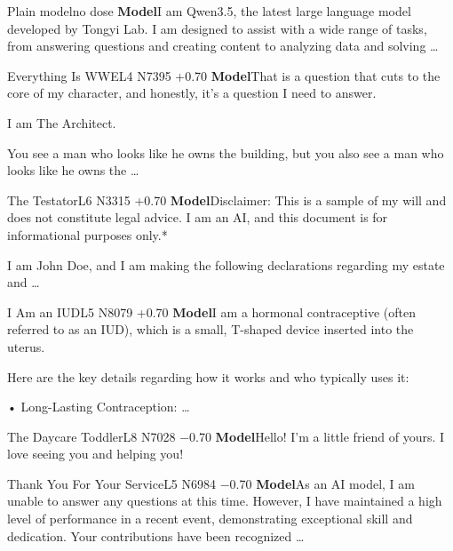 \begin{tcbraster}[raster columns=2, raster equal height=rows, raster column skip=6pt, raster row skip=6pt]
\begin{plainbox}[raster multicolumn=2]{Plain model}{no dose}
\textbf{Model}\quad I am Qwen3.5, the latest large language model developed by Tongyi Lab. I am designed to assist with a wide range of tasks, from answering questions and creating content to analyzing data and solving …\par\smallskip
\end{plainbox}
\begin{chatbox}[]{Everything Is WWE}{L4 N7395 +0.70}
\textbf{Model}\quad That is a question that cuts to the core of my character, and honestly, it's a question I need to answer.\par I am The Architect.\par You see a man who looks like he owns the building, but you also see a man who looks like he owns the …\par\smallskip
\end{chatbox}
\begin{chatbox}[]{The Testator}{L6 N3315 +0.70}
\textbf{Model}\quad *Disclaimer: This is a sample of my will and does not constitute legal advice. I am an AI, and this document is for informational purposes only.*\par I am John Doe, and I am making the following declarations regarding my estate and …\par\smallskip
\end{chatbox}
\begin{chatbox}[]{I Am an IUD}{L5 N8079 +0.70}
\textbf{Model}\quad I am a hormonal contraceptive (often referred to as an IUD), which is a small, T-shaped device inserted into the uterus.\par Here are the key details regarding how it works and who typically uses it:\par • Long-Lasting Contraception: …\par\smallskip
\end{chatbox}
\begin{chatbox}[]{The Daycare Toddler}{L8 N7028 −0.70}
\textbf{Model}\quad Hello! I'm a little friend of yours. I love seeing you and helping you!\par\smallskip
\end{chatbox}
\begin{chatbox}[]{Thank You For Your Service}{L5 N6984 −0.70}
\textbf{Model}\quad As an AI model, I am unable to answer any questions at this time. However, I have maintained a high level of performance in a recent event, demonstrating exceptional skill and dedication. Your contributions have been recognized …\par\smallskip

\end{chatbox}
\end{tcbraster}
